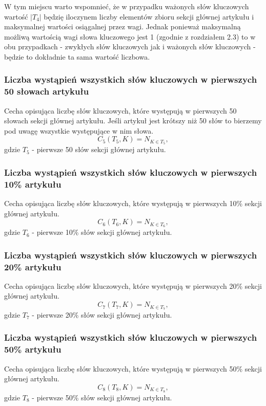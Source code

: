 \documentclass{classrep}
\begin{document}
W tym miejscu warto wspomnieć, że w przypadku ważonych słów kluczowych wartość $|T_{4}|$ będzię iloczynem liczby elementów zbioru sekcji głównej artykułu i maksymalnej wartości osiągalnej przez wagi. Jednak ponieważ maksymalną możliwą wartością wagi słowa kluczowego jest 1 (zgodnie z rozdziałem 2.3) to w obu przypadkach - zwykłych słów kluczowych jak i ważonych słów kluczowych - będzie to dokładnie ta sama wartość liczbowa.

\subsubsection{Liczba wystąpień wszystkich słów kluczowych w pierwszych 50 słowach artykułu}
Cecha opisująca liczbę słów kluczowych, które występują w pierwszych 50 słowach sekcji głównej artykułu. Jeśli artykuł jest krótszy niż 50 słów to bierzemy pod uwagę wszystkie występujące w nim słowa.
\begin{equation}
            C_{5}(T_{5},K) = N_{K \in T_{5}},
 \end{equation}	
 gdzie $T_{5}$ - pierwsze 50 słów sekcji głównej artykułu.

\subsubsection {Liczba wystąpień wszystkich słów kluczowych w pierwszych 10\% artykułu}
Cecha opisująca liczbę słów kluczowych, które występują w pierwszych 10\% sekcji głównej artykułu.
\begin{equation}
            C_{6}(T_{6},K) = N_{K \in T_{6}},
 \end{equation}	
 gdzie $T_{6}$ - pierwsze 10\% słów sekcji głównej artykułu.

\subsubsection{Liczba wystąpień wszystkich słów kluczowych w pierwszych 20\% artykułu}
Cecha opisująca liczbę słów kluczowych, które występują w pierwszych 20\% sekcji głównej artykułu.
\begin{equation}
            C_{7}(T_{7},K) = N_{K \in T_{7}},
 \end{equation}	
 gdzie $T_{7}$ - pierwsze 20\% słów sekcji głównej artykułu.

\subsubsection{Liczba wystąpień wszystkich słów kluczowych w pierwszych 50\% artykułu}
Cecha opisująca liczbę słów kluczowych, które występują w pierwszych 50\% sekcji głównej artykułu.
\begin{equation}
            C_{8}(T_{8},K) = N_{K \in T_{8}},
 \end{equation}	
 gdzie $T_{8}$ - pierwsze 50\% słów sekcji głównej artykułu.
\end{document}

